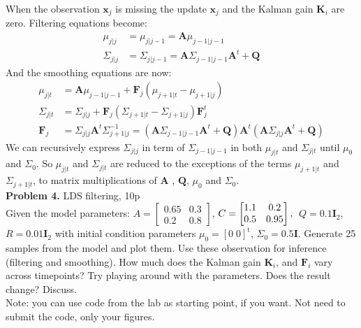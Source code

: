 \documentclass[12pt]{article}
\newcommand{\matr}[1]{\bm{#1}}     %
\newcommand{\vect}[1]{\mathbf{#1}}
\begin{document}
When the observation $\vect{x}_j$ is missing the update  $\vect{x}_j$ and the Kalman gain $\matr{K}_i$ are zero. Filtering equations become:
\begin{align*}
			\mu_{j|j}		&= \mu_{j | j-1 }		= \matr{A}  \mu_{j-1| j-1} \\
			\Sigma_{j|j}	&= \Sigma_{j|j-1}	=  \matr{A}  \Sigma_{j-1|j-1}  \matr{A}^t  +  \matr{Q} 
 \end{align*}
And the smoothing equations are now:
\begin{align*}
			\mu_{j|t}		&=	\matr{A}  \mu_{j-1| j-1} + \matr{F}_j (\mu_{j+1|t}  - \mu_{j+1|j}) \\
			\Sigma_{j|t}	&=	 \Sigma_{j|j}	+ \matr{F}_j (\Sigma_{j+1|t}  - \Sigma_{j+1|j})   \matr{F}_j^t \\
			 \matr{F}_j		&= 	\Sigma_{j|j}	 \matr{A}^t  \Sigma_{j+1|j}^{-1}	= (\matr{A}  \Sigma_{j-1|j-1}  \matr{A}^t  +  \matr{Q} )	 \matr{A}^t   
			 				(\matr{A}  \Sigma_{j|j}  \matr{A}^t  +  \matr{Q} )	
 \end{align*}
We can recursively express $\Sigma_{j|j}$ in term of $\Sigma_{j-1|j-1}$ in both $\mu_{j|t}$ and $\Sigma_{j|t}$  until $\mu_0$ and $\Sigma_0$. 
So $\mu_{j|t}$ and  $\Sigma_{j|t}$ are reduced to the exceptions of the terms $\mu_{j+1|t}$ and $\Sigma_{j+1|t}$,  to matrix multiplications of $\matr{A}$ , $ \matr{Q}$, $\mu_0$ and $\Sigma_0$.\\
\noindent \textbf{Problem 4.}  LDS filtering, 10p\\ 
Given the model parameters: $A = 
\begin{bmatrix} %
0.65 &   0.3\\
    0.2   & 0.8
\end{bmatrix}
$,
$C= 
\begin{bmatrix}  
    1.1 & 0.2\\
    0.5 & 0.95\\
\end{bmatrix},\\
$
$Q= 0.1 \vect{I}_2$, 
$R= 0.01 \vect{I}_2$ with initial condition parameters $\mu_0 = [0\; 0]^\mathrm{t}$, $\Sigma_0 = 0.5 \vect{I}$.
Generate 25 samples from the model and  plot them. Use these observation for inference (filtering and smoothing). How much does the Kalman gain $\mathbf{K}_i$, and $\mathbf{F}_i$ vary across timepoints? Try playing around with the parameters. Does the result change? Discuss.\\
Note: you can use code from the lab as starting point, if you want. Not need to submit the code, only your figures.
\\
\end{document}
